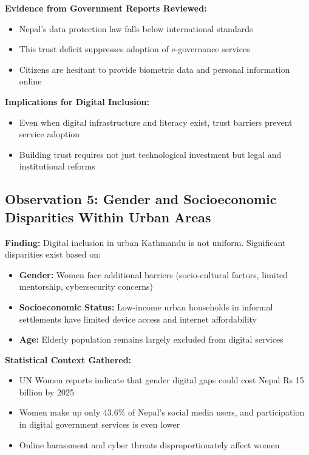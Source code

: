 \documentclass[12pt,a4paper]{article}
\begin{document}
\textbf{Evidence from Government Reports Reviewed:}
\begin{itemize}
    \item Nepal's data protection law falls below international standards
    \item This trust deficit suppresses adoption of e-governance services
    \item Citizens are hesitant to provide biometric data and personal information online
\end{itemize}

\textbf{Implications for Digital Inclusion:}
\begin{itemize}
    \item Even when digital infrastructure and literacy exist, trust barriers prevent service adoption
    \item Building trust requires not just technological investment but legal and institutional reforms
\end{itemize}

\subsection{Observation 5: Gender and Socioeconomic Disparities Within Urban Areas}

\textbf{Finding:} Digital inclusion in urban Kathmandu is not uniform. Significant disparities exist based on:
\begin{itemize}
    \item \textbf{Gender:} Women face additional barriers (socio-cultural factors, limited mentorship, cybersecurity concerns)
    \item \textbf{Socioeconomic Status:} Low-income urban households in informal settlements have limited device access and internet affordability
    \item \textbf{Age:} Elderly population remains largely excluded from digital services
\end{itemize}

\textbf{Statistical Context Gathered:}
\begin{itemize}
    \item UN Women reports indicate that gender digital gaps could cost Nepal Rs 15 billion by 2025
    \item Women make up only 43.6\% of Nepal's social media users, and participation in digital government services is even lower
    \item Online harassment and cyber threats disproportionately affect women
\end{itemize}
\end{document}
